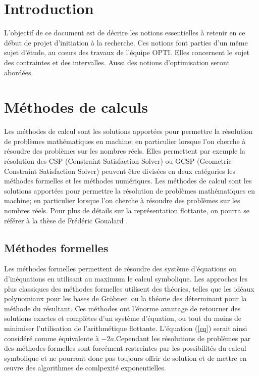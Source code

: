\section{Introduction }
L'objectif de ce document est de décrire les notions essentielles à retenir en ce début de projet d'initiation à la recherche. Ces notions font parties d'un même sujet d'étude, au cœurs des travaux de l'équipe OPTI. Elles concernent le sujet des contraintes et des intervalles. Aussi des notions d'optimisation seront abordées.

\section{Méthodes de calculs}
Les méthodes de calcul sont les solutions apportées pour permettre la résolution de problèmes mathématiques en machine; en particulier lorsque l'on cherche à résoudre des problèmes sur les nombres réels. Elles permettent par exemple la résolution des CSP (Constraint Satisfaction Solver) ou GCSP (Geometric Constraint Satisfaction Solver) peuvent être divisées en deux catégories les méthodes formelles et les méthodes numériques. Les méthodes de calcul sont les solutions apportées pour permettre la résolution de problèmes mathématiques en machine; en particulier lorsque l'on cherche à résoudre des problèmes sur les nombres réels. Pour plus de détails sur la représentation flottante, on pourra se référer à la thèse de Frédéric Goualard \cite{Goualard}. 


\subsection{Méthodes formelles}
Les méthodes formelles permettent de résoudre des système d'équations ou d'inéquations en utilisant au maximum le calcul symbolique. Les approches les plus classiques des méthodes formelles utilisent des théories, telles que les idéaux polynomiaux pour les bases de Gröbner, ou la théorie des déterminant pour la méthode du résultant. Ces méthodes ont l'énorme avantage de retourner des solutions exactes et complètes d'un système d'équation, ou tout du moins de minimiser l'utilisation de l'arithmétique flottante. L'équation (\ref{eq}) serait ainsi considéré comme équivalente à $-2a$.Cependant les résolutions de problèmes par des méthodes formelles sont forcément restreintes par les possibilités du calcul symbolique et ne pourront donc pas toujours offrir de solution et  de mettre en œuvre des algorithmes de comlpexité exponentielles.



